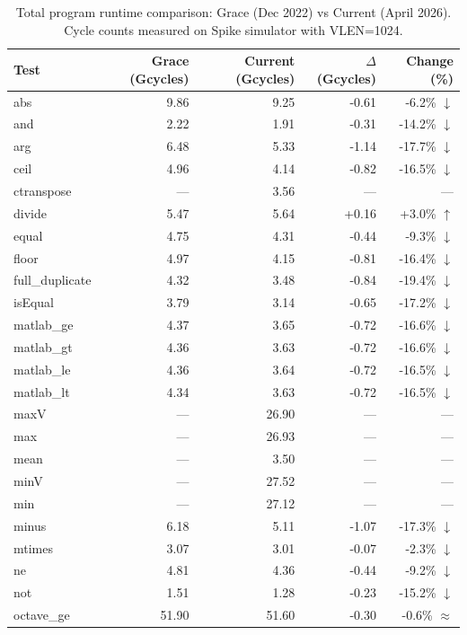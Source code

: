 \begin{table}[H]
\centering
\caption{Total program runtime comparison: Grace (Dec 2022) vs Current (April 2026). Cycle counts measured on Spike simulator with VLEN=1024.}
\label{tab:total-runtime}
\small
\begin{tabular}{l r r r r}
\toprule
Test & Grace (Gcycles) & Current (Gcycles) & $\Delta$ (Gcycles) & Change (\%) \\
\midrule
  abs & 9.86 & 9.25 & -0.61 & -6.2\% $\downarrow$ \\
  and & 2.22 & 1.91 & -0.31 & -14.2\% $\downarrow$ \\
  arg & 6.48 & 5.33 & -1.14 & -17.7\% $\downarrow$ \\
  ceil & 4.96 & 4.14 & -0.82 & -16.5\% $\downarrow$ \\
  ctranspose & --- & 3.56 & --- & ---  \\
  divide & 5.47 & 5.64 & +0.16 & +3.0\% $\uparrow$ \\
  equal & 4.75 & 4.31 & -0.44 & -9.3\% $\downarrow$ \\
  floor & 4.97 & 4.15 & -0.81 & -16.4\% $\downarrow$ \\
  full\_duplicate & 4.32 & 3.48 & -0.84 & -19.4\% $\downarrow$ \\
  isEqual & 3.79 & 3.14 & -0.65 & -17.2\% $\downarrow$ \\
  matlab\_ge & 4.37 & 3.65 & -0.72 & -16.6\% $\downarrow$ \\
  matlab\_gt & 4.36 & 3.63 & -0.72 & -16.6\% $\downarrow$ \\
  matlab\_le & 4.36 & 3.64 & -0.72 & -16.5\% $\downarrow$ \\
  matlab\_lt & 4.34 & 3.63 & -0.72 & -16.5\% $\downarrow$ \\
  maxV & --- & 26.90 & --- & ---  \\
  max & --- & 26.93 & --- & ---  \\
  mean & --- & 3.50 & --- & ---  \\
  minV & --- & 27.52 & --- & ---  \\
  min & --- & 27.12 & --- & ---  \\
  minus & 6.18 & 5.11 & -1.07 & -17.3\% $\downarrow$ \\
  mtimes & 3.07 & 3.01 & -0.07 & -2.3\% $\downarrow$ \\
  ne & 4.81 & 4.36 & -0.44 & -9.2\% $\downarrow$ \\
  not & 1.51 & 1.28 & -0.23 & -15.2\% $\downarrow$ \\
  octave\_ge & 51.90 & 51.60 & -0.30 & -0.6\% $\approx$ \\

\end{tabular}
\end{table}
